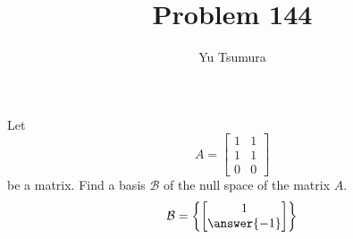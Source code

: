 \documentclass{ximera}
\title{Problem 144}
\author{Yu Tsumura}
\begin{document}
\begin{problem}
  
  Let 
  \[A=\begin{bmatrix}
      1 & 1 \\
      1 & 1 \\
      0 & 0 
    \end{bmatrix}\]
  be a matrix. Find a basis $\mathcal{B}$ of the null space of the matrix $A$.
  \[
    \mathcal{B} = \left\{
        \begin{bmatrix}
          1  \\
          \answer{-1}  
        \end{bmatrix}
      \right\}
  \]
 \end{problem}
\end{document}
